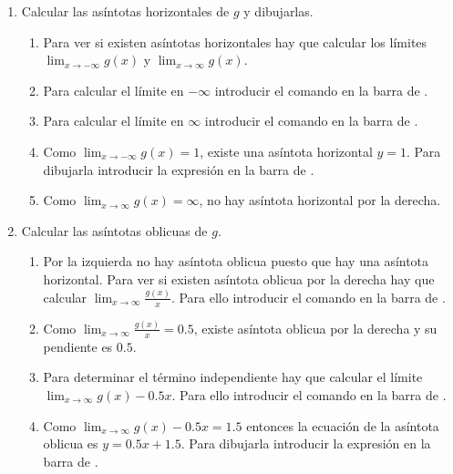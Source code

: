 \begin{enumerate}[leftmargin=*]
\begin{enumerate}
      \item Calcular las asíntotas horizontales de $g$ y dibujarlas.
            \begin{indication}
            \begin{enumerate}
            \item Para ver si existen asíntotas horizontales hay que calcular los límites $\lim_{x\rightarrow -\infty} g(x)$ y $\lim_{x\rightarrow \infty} g(x)$.
            \item Para calcular el límite en $-\infty$ introducir el comando  en la barra de .
            \item Para calcular el límite en $\infty$ introducir el comando  en la barra de .
            \item Como $\lim_{x\rightarrow -\infty} g(x)=1$, existe una asíntota horizontal $y=1$.
                  Para dibujarla introducir la expresión  en la barra de .
            \item Como $\lim_{x\rightarrow \infty} g(x)=\infty$, no hay asíntota horizontal por la derecha.
            \end{enumerate}
            \end{indication}

      \item Calcular las asíntotas oblicuas de $g$.
            \begin{indication}
            \begin{enumerate}
            \item Por la izquierda no hay asíntota oblicua puesto que hay una asíntota horizontal.
                  Para ver si existen asíntota oblicua por la derecha hay que calcular $\lim_{x\rightarrow \infty}\frac{g(x)}{x}$.
                  Para ello introducir el comando  en la barra de .
            \item Como $\lim_{x\rightarrow \infty}\frac{g(x)}{x}=0.5$, existe asíntota oblicua por la derecha y su pendiente es $0.5$.
            \item Para determinar el término independiente hay que calcular el límite $\lim_{x\rightarrow \infty}g(x)-0.5x$.
                  Para ello introducir el comando  en la barra de .
            \item Como $\lim_{x\rightarrow \infty}g(x)-0.5x=1.5$ entonces la ecuación de la asíntota oblicua es $y=0.5x+1.5$.
                  Para dibujarla introducir la expresión  en la barra de .
            \end{enumerate}
            \end{indication}
      \end{enumerate}


\end{enumerate}
